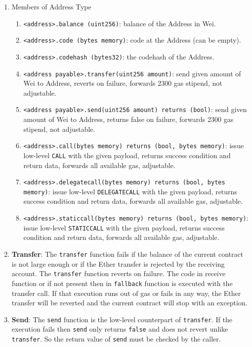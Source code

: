\begin{enumerate}
\item Members of Address Type
    \begin{enumerate}
    \item\verb|<address>.balance (uint256)|: balance of the Address in Wei.
    \item\verb|<address>.code (bytes memory)|: code at the Address (can be empty).
    \item\verb|<address>.codehash (bytes32)|: the codehash of the Address.
    \item\verb|<address payable>.transfer(uint256 amount)|: send given amount of Wei to Address, reverts on failure, forwards 2300 gas stipend, not adjustable.
    \item\verb|<address payable>.send(uint256 amount) returns (bool)|: send given amount of Wei to Address, returns false on failure, forwards 2300 gas stipend, not adjustable.
    \item\verb|<address>.call(bytes memory) returns (bool, bytes memory)|: issue low-level \verb|CALL| with the given payload, returns success condition and return data, forwards all available gas, adjustable.
    \item\verb|<address>.delegatecall(bytes memory) returns (bool, bytes memory)|: issue low-level \verb|DELEGATECALL| with the given payload, returns success condition and return data, forwards all available gas, adjustable.
    \item\verb|<address>.staticcall(bytes memory) returns (bool, bytes memory)|: issue low-level \verb|STATICCALL| with the given payload, returns success condition and return data, forwards all available gas, adjustable.
    \end{enumerate}

\item\textbf{Transfer}: The \verb|transfer| function fails if the balance of the current contract is not large enough or if the Ether transfer is rejected by the receiving account. The \verb|transfer| function reverts on failure. The code in receive function or if not present then in \verb|fallback| function is executed with the transfer call. If that execution runs out of gas or fails in any way, the Ether transfer will be reverted and the current contract will stop with an exception.

\item\textbf{Send}: The \verb|send| function is the low-level counterpart of \verb|transfer|. If the execution fails then \verb|send| only returns \verb|false| and does not revert unlike \verb|transfer|. So the return value of \verb|send| must be checked by the caller.


\end{enumerate}
